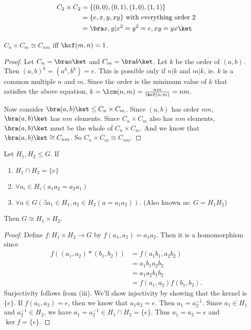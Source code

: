 \documentclass[a4paper]{article}
\begin{document}
  \begin{eg}
    \begin{align*}
      C_2\times C_2 &= \{(0, 0), (0, 1), (1, 0), (1, 1)\}\\
      &= \{e, x, y, xy\} \text{ with everything order 2}\\
      &= \bra x, y|x^2=y^2=e, xy = yx\ket
    \end{align*}
  \end{eg}

  \begin{prop}
    $C_n\times C_m\cong C_{nm}$ iff $\hcf(m, n) = 1$.
  \end{prop}

  \begin{proof}
    Let $C_n = \bra a\ket$ and $C_m = \bra b \ket$. Let $k$ be the order of $(a, b)$. Then $(a, b)^k = (a^k, b^k) = e$. This is possible only if $n | k$ and $m | k$, ie. $k$ is a common multiple $n$ and $m$. Since the order is the minimum value of $k$ that satisfies the above equation, $k = \lcm(n, m) = \frac{nm}{\hcf(n, m)} = nm$.

    Now consider $\bra (a, b)\ket \leq C_n\times C_m$. Since $(a, b)$ has order $nm$, $\bra (a, b)\ket$ has $nm$ elements. Since $C_n\times C_m$ also has $nm$ elements, $\bra (a, b)\ket$ must be the whole of $C_n\times C_m$. And we know that $\bra (a, b)\ket\cong C_{nm}$. So $C_n\times C_m \cong C_{nm}$.
  \end{proof}

  \begin{prop}
    Let $H_1, H_2\leq G$. If
    \begin{enumerate}
      \item $H_1\cap H_2 = \{e\}$
      \item $\forall a_i\in H_i(a_1a_2=a_2a_1)$
      \item $\forall a\in G(\exists a_1\in H_1, a_2\in H_2(a = a_1a_2))$. (Also known as: $G=H_1H_2$)
    \end{enumerate}
    Then $G\cong H_1\times H_2$.
  \end{prop}

  \begin{proof}
    Define $f:H_1\times H_2\rightarrow G$ by $f(a_1, a_2) = a_1a_2$. Then it is a homomorphism since
    \begin{align*}
      f((a_1, a_2)*(b_1,b_2)) &= f(a_1b_1, a_2b_2)\\
      &= a_1b_1a_2b_2\\
      &= a_1a_2b_1b_2\\
      &= f(a_1, a_2)f(b_1,b_2).
    \end{align*}
    Surjectivity follows from (iii). We'll show injectivity by showing that the kernel is $\{e\}$. If $f(a_1, a_2)=e$, then we know that $a_1a_2 = e$. Then $a_1=a_2^{-1}$. Since $a_1 \in H_1$ and $a_2^{-1} \in H_2$, we have $a_1 = a_2^{-1} \in H_1\cap H_2 = \{e\}$. Thus $a_1 = a_2 = e$ and $\ker f = \{e\}$.
  \end{proof}
\end{document}
